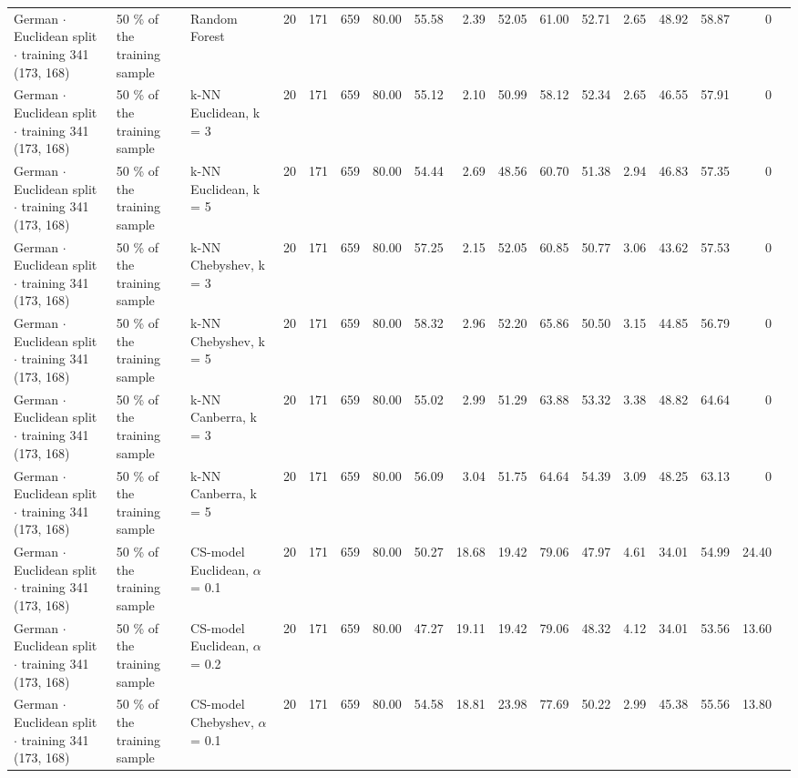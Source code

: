 \begin{longtable}{lllrrrrrrrrrrrrrl}
  German $\cdot$ Euclidean split $\cdot$ training 341 (173, 168) & 50 \% of the training sample & Random Forest & 20 & 171 & 659 & 80.00 & 55.58 & 2.39 & 52.05 & 61.00 & 52.71 & 2.65 & 48.92 & 58.87 & 0 &  \\
  German $\cdot$ Euclidean split $\cdot$ training 341 (173, 168) & 50 \% of the training sample & k-NN Euclidean, k = 3 & 20 & 171 & 659 & 80.00 & 55.12 & 2.10 & 50.99 & 58.12 & 52.34 & 2.65 & 46.55 & 57.91 & 0 &  \\
  German $\cdot$ Euclidean split $\cdot$ training 341 (173, 168) & 50 \% of the training sample & k-NN Euclidean, k = 5 & 20 & 171 & 659 & 80.00 & 54.44 & 2.69 & 48.56 & 60.70 & 51.38 & 2.94 & 46.83 & 57.35 & 0 &  \\
  German $\cdot$ Euclidean split $\cdot$ training 341 (173, 168) & 50 \% of the training sample & k-NN Chebyshev, k = 3 & 20 & 171 & 659 & 80.00 & 57.25 & 2.15 & 52.05 & 60.85 & 50.77 & 3.06 & 43.62 & 57.53 & 0 &  \\
  German $\cdot$ Euclidean split $\cdot$ training 341 (173, 168) & 50 \% of the training sample & k-NN Chebyshev, k = 5 & 20 & 171 & 659 & 80.00 & 58.32 & 2.96 & 52.20 & 65.86 & 50.50 & 3.15 & 44.85 & 56.79 & 0 &  \\
  German $\cdot$ Euclidean split $\cdot$ training 341 (173, 168) & 50 \% of the training sample & k-NN Canberra, k = 3 & 20 & 171 & 659 & 80.00 & 55.02 & 2.99 & 51.29 & 63.88 & 53.32 & 3.38 & 48.82 & 64.64 & 0 &  \\
  German $\cdot$ Euclidean split $\cdot$ training 341 (173, 168) & 50 \% of the training sample & k-NN Canberra, k = 5 & 20 & 171 & 659 & 80.00 & 56.09 & 3.04 & 51.75 & 64.64 & 54.39 & 3.09 & 48.25 & 63.13 & 0 &  \\
  German $\cdot$ Euclidean split $\cdot$ training 341 (173, 168) & 50 \% of the training sample & CS-model Euclidean, $\alpha$ = 0.1 & 20 & 171 & 659 & 80.00 & 50.27 & 18.68 & 19.42 & 79.06 & 47.97 & 4.61 & 34.01 & 54.99 & 24.40 &  \\
  German $\cdot$ Euclidean split $\cdot$ training 341 (173, 168) & 50 \% of the training sample & CS-model Euclidean, $\alpha$ = 0.2 & 20 & 171 & 659 & 80.00 & 47.27 & 19.11 & 19.42 & 79.06 & 48.32 & 4.12 & 34.01 & 53.56 & 13.60 &  \\
  German $\cdot$ Euclidean split $\cdot$ training 341 (173, 168) & 50 \% of the training sample & CS-model Chebyshev, $\alpha$ = 0.1 & 20 & 171 & 659 & 80.00 & 54.58 & 18.81 & 23.98 & 77.69 & 50.22 & 2.99 & 45.38 & 55.56 & 13.80 &  \\

\end{longtable}
